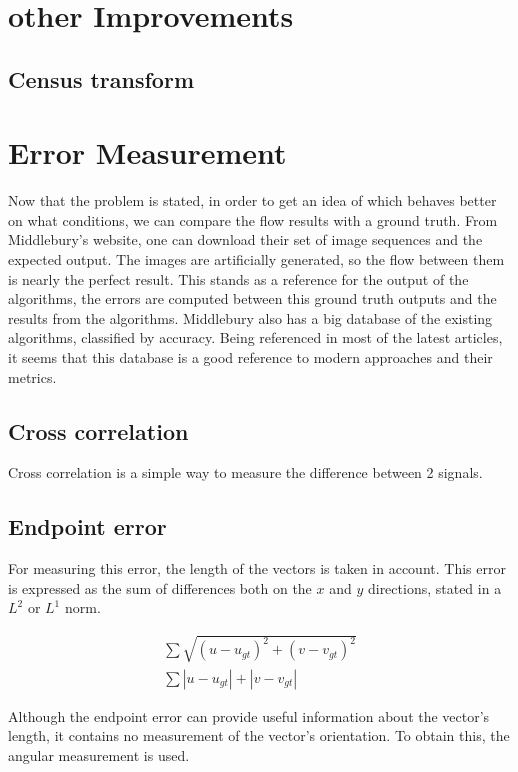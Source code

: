 \documentclass[12pt,a4paper,twoside]{report}
\begin{document}
\section{other Improvements}
\subsection{Census transform}
\section{Error Measurement}
Now that the problem is stated, in order to get an idea of which behaves better on what conditions, we can compare the flow results with a ground truth. From Middlebury's website\cite{middleburry}, one can download their set of image sequences and the expected output. The images are artificially generated, so the flow between them is nearly the perfect result. This stands as a reference for the output of the algorithms, the errors are computed between this ground truth outputs and the results from the algorithms. Middlebury \cite{middleburry} also has a big database of the existing algorithms, classified by accuracy. Being referenced in most of the latest articles, it seems that this database is a good reference to modern approaches and their metrics.

\subsection{Cross correlation}

Cross correlation is a simple way to measure the difference between 2 signals.
\subsection{Endpoint error}
For measuring this error, the length of the vectors is taken in account. This error is expressed as the sum of differences both on the $x$ and $y$ directions, stated in a $L^2$ or $L^1$ norm.

\begin{equation}
\begin{split}
\sum  \sqrt{(u-u_{gt})^2+(v-v_{gt})^2} \\ 
\sum |u-u_{gt}|+|v-v_{gt}|
\end{split}
\end{equation}

Although the endpoint error can provide useful information about the vector's length, it contains no measurement of  the vector's orientation. To obtain this, the angular measurement is used.
\end{document}
